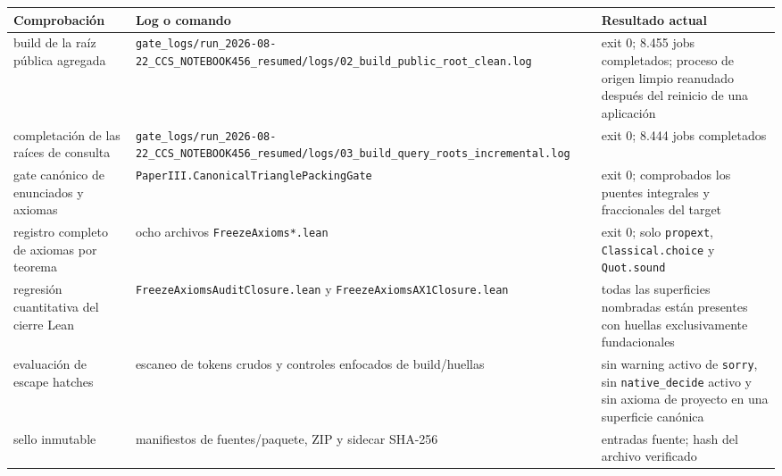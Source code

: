 \documentclass[spanish,11pt,a4paper]{article}
\newcounter{none}
\begin{document}
{\def\LTcaptype{none} %
\begin{longtable}[]{@{}
  >{\raggedright\arraybackslash}p{}
  >{\raggedright\arraybackslash}p{}
  >{\raggedright\arraybackslash}p{}@{}}
\toprule\noalign{}
\begin{minipage}[b]{\linewidth}\raggedright
Comprobación
\end{minipage} & \begin{minipage}[b]{\linewidth}\raggedright
Log o comando
\end{minipage} & \begin{minipage}[b]{\linewidth}\raggedright
Resultado actual
\end{minipage} \\
\midrule\noalign{}
\endhead
\bottomrule\noalign{}
\endlastfoot
build de la raíz pública agregada &
\nolinkurl{gate_logs/run_2026-08-22_CCS_NOTEBOOK456_resumed/logs/02_build_public_root_clean.log}
& exit 0; 8.455 jobs completados; proceso de origen limpio reanudado
después del reinicio de una aplicación \\
completación de las raíces de consulta &
\nolinkurl{gate_logs/run_2026-08-22_CCS_NOTEBOOK456_resumed/logs/03_build_query_roots_incremental.log}
& exit 0; 8.444 jobs completados \\
gate canónico de enunciados y axiomas &
\nolinkurl{PaperIII.CanonicalTrianglePackingGate} & exit 0; comprobados los
puentes integrales y fraccionales del target \\
registro completo de axiomas por teorema & ocho archivos
\nolinkurl{FreezeAxioms*.lean} & exit 0; solo \nolinkurl{propext},
\nolinkurl{Classical.choice} y \nolinkurl{Quot.sound} \\
regresión cuantitativa del cierre Lean &
\nolinkurl{FreezeAxiomsAuditClosure.lean} y
\nolinkurl{FreezeAxiomsAX1Closure.lean} & todas las superficies nombradas
están presentes con huellas exclusivamente fundacionales \\
evaluación de escape hatches & escaneo de tokens crudos y controles
enfocados de build/huellas & sin warning activo de \nolinkurl{sorry}, sin
\nolinkurl{native_decide} activo y sin axioma de proyecto en una
superficie canónica \\
sello inmutable & manifiestos de fuentes/paquete, ZIP y sidecar SHA-256
& 707 entradas fuente; hash del archivo verificado \\
\end{longtable}
}
\end{document}
